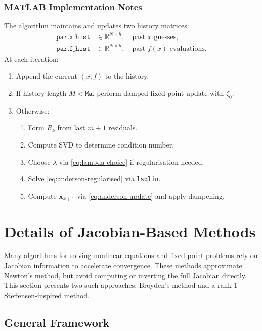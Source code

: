 \documentclass[a4paper,12pt]{article}
\begin{document}
\subsubsection{MATLAB Implementation Notes}
The algorithm maintains and updates two history matrices:
\begin{align*}
    \texttt{par.x\_hist} &\in \mathbb{R}^{N \times h}, \quad\text{past $x$ guesses}, \\
    \texttt{par.f\_hist} &\in \mathbb{R}^{N \times h}, \quad\text{past $f(x)$ evaluations}.
\end{align*}
At each iteration:
\begin{enumerate}
    \item Append the current $(x, f)$ to the history.
    \item If history length $M < \texttt{Ma}$, perform damped fixed-point update with $\zeta_0$.
    \item Otherwise:
        \begin{enumerate}
            \item Form $R_k$ from last $m+1$ residuals.
            \item Compute SVD to determine condition number.
            \item Choose $\lambda$ via \eqref{eq:lambda-choice} if regularisation needed.
            \item Solve \eqref{eq:anderson-regularised} via \texttt{lsqlin}.
            \item Compute $\mathbf{x}_{k+1}$ via \eqref{eq:anderson-update} and apply dampening.
        \end{enumerate}
\end{enumerate}


\section{Details of Jacobian-Based Methods}
\label{sec:jacobian-methods}

Many algorithms for solving nonlinear equations and fixed-point problems rely on Jacobian information to accelerate convergence. These methods approximate Newton's method, but avoid computing or inverting the full Jacobian directly. This section presents two such approaches: Broyden's method and a rank-1 Steffensen-inspired method.

\subsection{General Framework}
\end{document}
